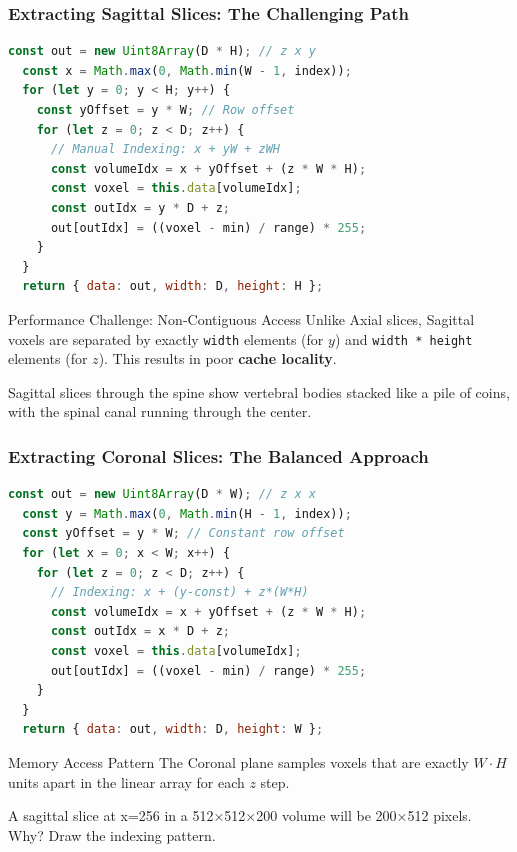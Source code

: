 \begin{frame}[fragile]
\frametitle{Extracting Sagittal Slices: The Challenging Path}
\begin{lstlisting}[language=JavaScript]
  const out = new Uint8Array(D * H); // z x y
  const x = Math.max(0, Math.min(W - 1, index));
  for (let y = 0; y < H; y++) {
    const yOffset = y * W; // Row offset
    for (let z = 0; z < D; z++) {
      // Manual Indexing: x + yW + zWH
      const volumeIdx = x + yOffset + (z * W * H);
      const voxel = this.data[volumeIdx];
      const outIdx = y * D + z;
      out[outIdx] = ((voxel - min) / range) * 255;
    }
  }
  return { data: out, width: D, height: H };
\end{lstlisting}

\begin{alertblock}{Performance Challenge: Non-Contiguous Access}
Unlike Axial slices, Sagittal voxels are separated by exactly \texttt{width} elements (for $y$) and \texttt{width * height} elements (for $z$). This results in poor \textbf{cache locality}.
\end{alertblock}

Sagittal slices through the spine show vertebral bodies stacked like a pile of coins, with the spinal canal running through the center.
\end{frame}

\begin{frame}[fragile]
\frametitle{Extracting Coronal Slices: The Balanced Approach}
\begin{lstlisting}[language=JavaScript]
  const out = new Uint8Array(D * W); // z x x
  const y = Math.max(0, Math.min(H - 1, index));
  const yOffset = y * W; // Constant row offset
  for (let x = 0; x < W; x++) {
    for (let z = 0; z < D; z++) {
      // Indexing: x + (y-const) + z*(W*H)
      const volumeIdx = x + yOffset + (z * W * H);
      const outIdx = x * D + z;
      const voxel = this.data[volumeIdx];
      out[outIdx] = ((voxel - min) / range) * 255;
    }
  }
  return { data: out, width: D, height: W };
\end{lstlisting}

\begin{block}{Memory Access Pattern}
The Coronal plane samples voxels that are exactly $W \cdot H$ units apart in the linear array for each $z$ step.
\end{block}

A sagittal slice at x=256 in a 512×512×200 volume will be 200×512 pixels. Why? Draw the indexing pattern.
\end{frame}

